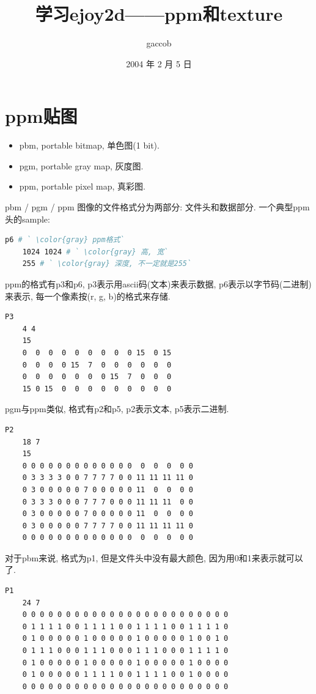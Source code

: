 

\title {\ZHH \huge 学习ejoy2d——ppm和texture}
\author {\small gaccob}
\date {\small 2004 年 2 月 5 日}
\maketitle

\section* {\ZHH \Large ppm贴图} {
    \begin {itemize}
    \item {pbm, portable bitmap, 单色图(1 bit). }
    \item {pgm, portable gray map, 灰度图. }
    \item {ppm, portable pixel map, 真彩图. }
    \end {itemize}\par

    {pbm / pgm / ppm 图像的文件格式分为两部分: 文件头和数据部分. 一个典型ppm头的sample: }\par
    \begin{lstlisting}[language=bash]
    p6 # ` \color{gray} ppm格式`
    1024 1024 # ` \color{gray} 高, 宽`
    255 # ` \color{gray} 深度, 不一定就是255`
    \end{lstlisting}

    {ppm的格式有p3和p6, p3表示用ascii码(文本)来表示数据, p6表示以字节码(二进制)来表示, 每一个像素按(r, g, b)的格式来存储. }\par
    \begin{lstlisting}[language=bash]
    P3
    4 4
    15
    0  0  0  0  0  0  0  0  0 15  0 15
    0  0  0  0 15  7  0  0  0  0  0  0
    0  0  0  0  0  0  0 15  7  0  0  0
    15 0 15  0  0  0  0  0  0  0  0  0
    \end{lstlisting}

    {pgm与ppm类似, 格式有p2和p5, p2表示文本, p5表示二进制.}\par
    \begin{lstlisting}[language=bash]
    P2
    18 7
    15
    0 0 0 0 0 0 0 0 0 0 0 0 0  0  0  0  0 0
    0 3 3 3 3 0 0 7 7 7 7 0 0 11 11 11 11 0
    0 3 0 0 0 0 0 7 0 0 0 0 0 11  0  0  0 0
    0 3 3 3 0 0 0 7 7 7 0 0 0 11 11 11  0 0
    0 3 0 0 0 0 0 7 0 0 0 0 0 11  0  0  0 0
    0 3 0 0 0 0 0 7 7 7 7 0 0 11 11 11 11 0
    0 0 0 0 0 0 0 0 0 0 0 0 0  0  0  0  0 0
    \end{lstlisting}

    {对于pbm来说, 格式为p1, 但是文件头中没有最大颜色, 因为用0和1来表示就可以了.}\par
    \begin{lstlisting}[language=bash]
    P1
    24 7
    0 0 0 0 0 0 0 0 0 0 0 0 0 0 0 0 0 0 0 0 0 0 0 0
    0 1 1 1 1 0 0 1 1 1 1 0 0 1 1 1 1 0 0 1 1 1 1 0
    0 1 0 0 0 0 0 1 0 0 0 0 0 1 0 0 0 0 0 1 0 0 1 0
    0 1 1 1 0 0 0 1 1 1 0 0 0 1 1 1 0 0 0 1 1 1 1 0
    0 1 0 0 0 0 0 1 0 0 0 0 0 1 0 0 0 0 0 1 0 0 0 0
    0 1 0 0 0 0 0 1 1 1 1 0 0 1 1 1 1 0 0 1 0 0 0 0
    0 0 0 0 0 0 0 0 0 0 0 0 0 0 0 0 0 0 0 0 0 0 0 0
    \end{lstlisting}

}
